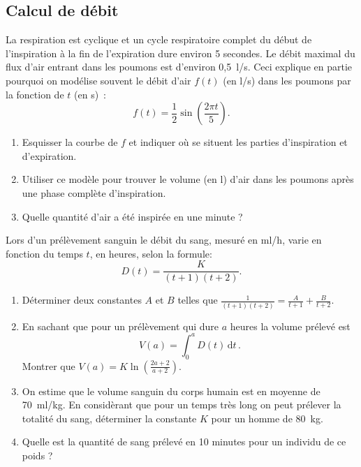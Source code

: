 \subsection{Calcul de débit}


\begin{exo}
    La respiration est cyclique et un cycle respiratoire complet du début de l'inspiration à la fin de l'expiration dure environ 5 secondes. Le débit maximal du flux d'air entrant dans les poumons est d'environ {0,5~l/s}. Ceci explique en partie pourquoi on modélise souvent le débit d'air $f(t)$ (en l/s) dans les poumons par la fonction de $t$ (en s)~:
    \begin{equation}
        f(t) = \frac 1 2 \sin(\frac {2\pi t} 5).
    \end{equation}
    \begin{enumerate}
        \item Esquisser la courbe de $f$ et indiquer où se situent les parties d'inspiration et d'expiration.
        \item Utiliser ce modèle pour trouver le volume (en l) d'air dans les poumons après une phase complète d'inspiration.
        \item Quelle quantité d'air a été inspirée en une minute ?
    \end{enumerate}
\end{exo}

\begin{exo}
    Lors d'un prélèvement sanguin le débit du sang, mesuré en {ml/h}, varie en fonction du temps $t$, en heures, selon la formule:
    $$
        D(t) = \frac{K}{(t+1)(t+2)}.
    $$
    \begin{enumerate}
        \item Déterminer deux constantes $A$ et $B$ telles que $\frac{1}{(t+1)(t+2)}=\frac{A}{t+1} + \frac{B}{t+2}$.
        \item En sachant que pour un prélèvement qui dure $a$ heures la volume prélevé  est
            $$
                V(a)=\int_0^a D(t)\,\mathrm{d}t\,.
            $$
        Montrer que $V(a) = K\ln\left(\frac{2a+2}{a+2}\right)$.
        \item On estime que le volume sanguin du corps humain est en moyenne de 70~{ml/kg}. En considèrant que pour un temps très long on peut prélever la totalité du sang, déterminer la constante $K$ pour un homme de 80~{kg}.
        \item Quelle est la quantité de sang prélevé en 10 minutes pour un individu de ce poids ?
    \end{enumerate}
\end{exo}


